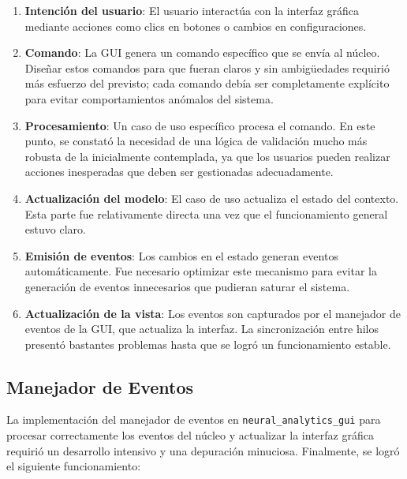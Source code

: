 \begin{enumerate}
    \item \textbf{Intención del usuario}: El usuario interactúa con la interfaz gráfica mediante acciones como clics en botones o cambios en configuraciones.
    \item \textbf{Comando}: La GUI genera un comando específico que se envía al núcleo. Diseñar estos comandos para que fueran claros y sin ambigüedades requirió más esfuerzo del previsto; cada comando debía ser completamente explícito para evitar comportamientos anómalos del sistema.
    \item \textbf{Procesamiento}: Un caso de uso específico procesa el comando. En este punto, se constató la necesidad de una lógica de validación mucho más robusta de la inicialmente contemplada, ya que los usuarios pueden realizar acciones inesperadas que deben ser gestionadas adecuadamente.
    \item \textbf{Actualización del modelo}: El caso de uso actualiza el estado del contexto. Esta parte fue relativamente directa una vez que el funcionamiento general estuvo claro.
    \item \textbf{Emisión de eventos}: Los cambios en el estado generan eventos automáticamente. Fue necesario optimizar este mecanismo para evitar la generación de eventos innecesarios que pudieran saturar el sistema.
    \item \textbf{Actualización de la vista}: Los eventos son capturados por el manejador de eventos de la GUI, que actualiza la interfaz. La sincronización entre hilos presentó bastantes problemas hasta que se logró un funcionamiento estable.
\end{enumerate}

\subsection{Manejador de Eventos}

La implementación del manejador de eventos en \texttt{neural\_analytics\_gui} para procesar correctamente los eventos del núcleo y actualizar la interfaz gráfica requirió un desarrollo intensivo y una depuración minuciosa. Finalmente, se logró el siguiente funcionamiento:

